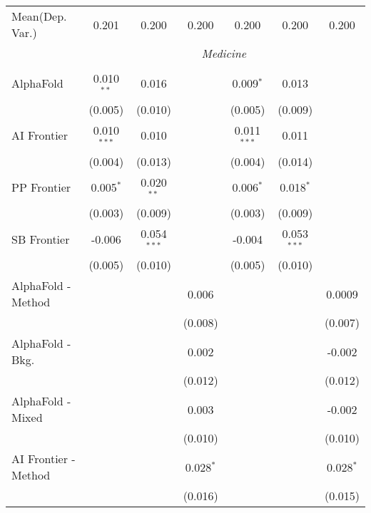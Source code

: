 \begin{tabular}{lcccccc}
Mean(Dep. Var.) & 0.201 & 0.200 & 0.200 & 0.200 & 0.200 & 0.200 \\
 & \multicolumn{6}{c}{\textit{Medicine}} \\ \\
   AlphaFold            & 0.010$^{**}$  & 0.016         &             & 0.009$^{*}$   & 0.013         &   \\   
                        & (0.005)       & (0.010)       &             & (0.005)       & (0.009)       &   \\   
   AI Frontier          & 0.010$^{***}$ & 0.010         &             & 0.011$^{***}$ & 0.011         &   \\   
                        & (0.004)       & (0.013)       &             & (0.004)       & (0.014)       &   \\   
   PP Frontier          & 0.005$^{*}$   & 0.020$^{**}$  &             & 0.006$^{*}$   & 0.018$^{*}$   &   \\   
                        & (0.003)       & (0.009)       &             & (0.003)       & (0.009)       &   \\   
   SB Frontier          & -0.006        & 0.054$^{***}$ &             & -0.004        & 0.053$^{***}$ &   \\   
                        & (0.005)       & (0.010)       &             & (0.005)       & (0.010)       &   \\   
   AlphaFold - Method   &               &               & 0.006       &               &               & 0.0009\\   
                        &               &               & (0.008)     &               &               & (0.007)\\   
   AlphaFold - Bkg.     &               &               & 0.002       &               &               & -0.002\\   
                        &               &               & (0.012)     &               &               & (0.012)\\   
   AlphaFold - Mixed    &               &               & 0.003       &               &               & -0.002\\   
                        &               &               & (0.010)     &               &               & (0.010)\\   
   AI Frontier - Method &               &               & 0.028$^{*}$ &               &               & 0.028$^{*}$\\   
                        &               &               & (0.016)     &               &               & (0.015)\\   

\end{tabular}
